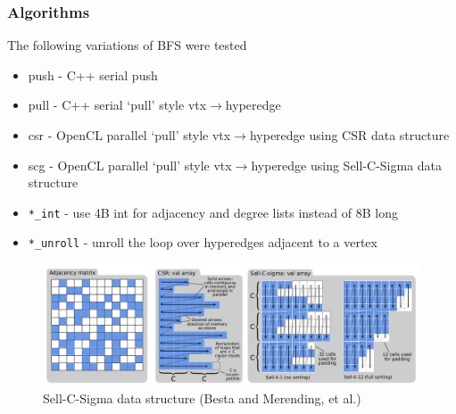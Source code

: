 \documentclass{beamer}
\begin{document}
\begin{frame}
  \frametitle{Algorithms}
  The following variations of BFS were tested
  \begin{itemize}
    \item push - C++ serial push
    \item pull - C++ serial `pull' style vtx$\rightarrow$hyperedge
    \item csr - OpenCL parallel `pull' style vtx$\rightarrow$hyperedge using CSR data
      structure
    \item scg - OpenCL parallel `pull' style vtx$\rightarrow$hyperedge using
      Sell-C-Sigma data structure
    \item \texttt{*\_int} - use 4B int for adjacency and degree lists instead of 8B long
    \item \texttt{*\_unroll} - unroll the loop over hyperedges adjacent to a
      vertex
  \end{itemize}
  \begin{figure}
    \centering
    \includegraphics[width=.6\textwidth]{figures/sellcsigma.png}\\
    \small{Sell-C-Sigma data structure (Besta and Merending, et al.)}
  \end{figure}
\end{frame}
\end{document}
